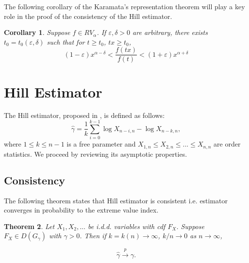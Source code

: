 \documentclass[english,12pt,a4paper,pdftex,sci,utf8]{aaltothesis} %
\newtheorem{theorem}{Theorem}[section]
\newtheorem{corollary}[theorem]{Corollary}
\begin{document}
The following corollary \cite{potter} of the Karamata’s representation theorem will play a key role in the proof of the consistency of the Hill estimator. 

\begin{corollary}
Suppose $f \in RV_{\alpha}$. If $\varepsilon, \delta>0$ are arbitrary, there exists $t_0=t_0(\varepsilon, \delta)$ such that for $t\geq t_0$, $tx \geq t_0$,
\begin{equation*}
(1-\varepsilon)x^{\alpha-\delta}<\frac{f(tx)}{f(t)}<(1+\varepsilon)x^{\alpha+\delta}
\end{equation*}
\label{inequality}
\end{corollary}



\clearpage

\section{Hill Estimator}
\label{hillEst}


The Hill estimator, proposed in \cite{hill}, is defined as follows:
\begin{equation*}
\hat{\gamma} = \frac{1}{k} \sum_{i=0}^{k-1} \log X_{n-i,n} - \log X_{n-k,n}, 
\end{equation*}
where $1 \leq k \leq n-1$ is a free parameter and $X_{1,n} \leq X_{2,n} \leq ...  \leq X_{n,n}$ are order statistics. We proceed by reviewing its asymptotic properties.

\subsection{Consistency}

The following theorem states that Hill estimator is consistent i.e. estimator converges in probability to the extreme value index. \cite{hill}


\begin{theorem}
Let $X_1, X_2,...$ be i.d.d. variables with cdf $F_X$. Suppose $F_X \in D(G_{\gamma})$ with $\gamma > 0$. Then if $k=k(n)  \rightarrow \infty$, $k/n \rightarrow 0$ as $n \rightarrow \infty$,

\begin{equation*}
\hat{\gamma} \xrightarrow{p} \gamma.
\end{equation*}
\label{hillcons}
\end{theorem}
\end{document}

